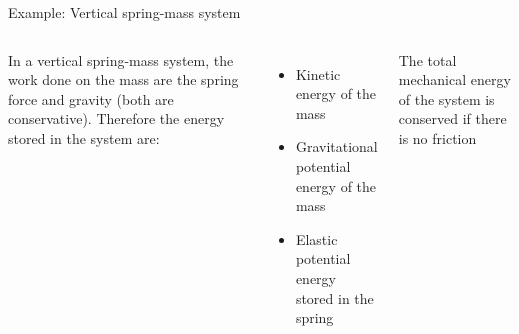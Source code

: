 \documentclass[12pt,compress,aspectratio=169]{beamer}
\begin{document}
\begin{frame}{Example: Vertical spring-mass system}
  \begin{columns}

    In a vertical spring-mass system, the work done on the mass are the
    spring force and gravity (both are conservative). Therefore the energy
    stored in the system are:
    \begin{itemize}
    \item Kinetic energy of the mass
    \item Gravitational potential energy of the mass
    \item Elastic potential energy stored in the spring
    \end{itemize}
    The total mechanical energy of the system is conserved if there is no
    friction
  \end{columns}
\end{frame}
\end{document}
